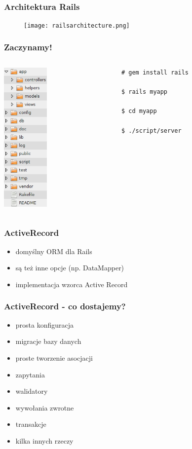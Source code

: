 \documentclass[12t]{beamer}
\begin{document}
\begin{frame}
  \frametitle{Architektura Rails}
  \begin{figure}
    \centering
    \texttt{[image: railsarchitecture.png]}
  \end{figure}
\end{frame}

\begin{frame}[fragile]
  \frametitle{Zaczynamy!}
  \begin{columns}[T]
    \begin{column}{2.3cm}
      \includegraphics[width=2.3cm]{structure.png}
    \end{column}
    \begin{column}{7.5cm}
\begin{verbatim}
# gem install rails

$ rails myapp

$ cd myapp

$ ./script/server
\end{verbatim}
    \end{column}
  \end{columns}
\end{frame}

\begin{frame}
  \frametitle{ActiveRecord}
  \begin{itemize}
  \item domyślny ORM dla Rails
  \item są też inne opcje (np. DataMapper)
  \item implementacja wzorca Active Record
  \end{itemize}
\end{frame}

\begin{frame}
  \frametitle{ActiveRecord - co dostajemy?}
  \begin{itemize}
  \item prosta konfiguracja
  \item migracje bazy danych
  \item proste tworzenie asocjacji
  \item zapytania
  \item walidatory
  \item wywołania zwrotne
  \item transakcje
  \item kilka innych rzeczy
  \end{itemize}
\end{frame}
\end{document}

